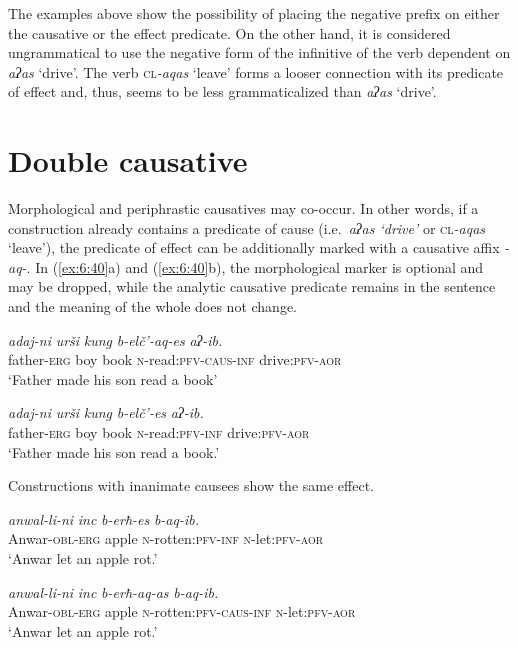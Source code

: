 ﻿\documentclass[output=paper]{langsci/langscibook}
\begin{document}
The examples above show the possibility of placing the negative prefix
on either the causative or the effect predicate. On the other hand, it is
considered ungrammatical to use the negative form of the infinitive of
the verb dependent on \emph{aʔas} `drive'. The verb
\textsc{cl}\emph{-aqas} `leave' forms a looser connection with its
predicate of effect and, thus, seems to be less grammaticalized than
\emph{aʔas} `drive'.
%


\section{Double causative}\label{Double-causative}


Morphological and periphrastic causatives may co-occur. In other words, if a
construction already contains a predicate of cause (i.e.\ \emph{aʔas
`drive'} or \textsc{cl}\emph{-aqas} `leave'), the predicate of effect
can be additionally marked with a causative affix \mbox{\emph{-aq-}}. In (\ref{ex:6:40}a)
and (\ref{ex:6:40}b), the morphological marker is optional and may be dropped,
while the analytic causative predicate remains in the sentence and the
meaning of the whole does not change.

\ea \label{ex:6:40} %
\ea %
\gll \emph{adaj-ni} \emph{urši} \emph{kung} \emph{b-elč'-aq-es} \emph{aʔ-ib.}\\
father-\textsc{erg} boy book \textsc{n}-read:\textsc{pfv}-\textsc{caus}-\textsc{inf} drive:\textsc{pfv}-\textsc{aor}\\
\glt `Father made his son read a book'

\ex %
\gll \emph{adaj-ni} \emph{urši} \emph{kung} \emph{b-elč'-es} \emph{aʔ-ib.}\\
father-\textsc{erg} boy book \textsc{n}-read:\textsc{pfv}-\textsc{inf} drive:\textsc{pfv}-\textsc{aor}\\
\glt `Father made his son read a book.'
\z
\z

Constructions with inanimate causees show the same effect.

\ea \label{ex:6:41} %
\ea %
\gll \emph{anwal-li-ni} \emph{inc} \emph{b-erħ-es} \emph{b-aq-ib.}\\
Anwar-\textsc{obl}-\textsc{erg} apple \textsc{n}-rotten:\textsc{pfv}-\textsc{inf} \textsc{n}-let:\textsc{pfv}-\textsc{aor}\\
\glt `Anwar let an apple rot.'

\ex %
\gll \emph{anwal-li-ni} \emph{inc} \emph{b-erħ-aq-as} \emph{b-aq-ib.}\\
Anwar-\textsc{obl}-\textsc{erg} apple \textsc{n}-rotten:\textsc{pfv}-\textsc{caus}-\textsc{inf} \textsc{n}-let:\textsc{pfv}-\textsc{aor}\\
\glt `Anwar let an apple rot.'
\z
\z
\end{document}
